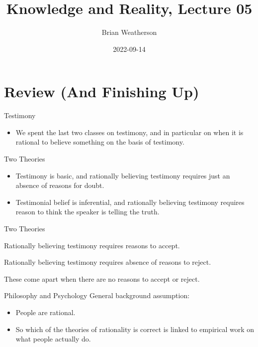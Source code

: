 \documentclass[
  17pt,
  letterpaper,
  ignorenonframetext,
  aspectratio=169,
  handout]{beamer}
\title{Knowledge and Reality, Lecture 05}
\author{Brian Weatherson}
\date{2022-09-14}
\providecommand{\tightlist}{%
  \setlength{\itemsep}{0pt}\setlength{\parskip}{0pt}}\usepackage{longtable,booktabs,array}
\begin{document}
\frame{\titlepage}
\ifdefined\Shaded\renewenvironment{Shaded}{\begin{tcolorbox}[interior hidden, frame hidden, borderline west={3pt}{0pt}{shadecolor}, boxrule=0pt, sharp corners, enhanced, breakable]}{\end{tcolorbox}}\fi

\hypertarget{review-and-finishing-up}{%
\section{Review (And Finishing Up)}\label{review-and-finishing-up}}

\begin{frame}{Testimony}
\protect\hypertarget{testimony}{}
\begin{itemize}[<+->]
\tightlist
\item
  We spent the last two classes on testimony, and in particular on when
  it is rational to believe something on the basis of testimony.
\end{itemize}
\end{frame}

\begin{frame}{Two Theories}
\protect\hypertarget{two-theories}{}
\begin{itemize}[<+->]
\tightlist
\item
  Testimony is basic, and rationally believing testimony requires just
  an absence of reasons for doubt.
\item
  Testimonial belief is inferential, and rationally believing testimony
  requires reason to think the speaker is telling the truth.
\end{itemize}
\end{frame}

\begin{frame}{Two Theories}
\protect\hypertarget{two-theories-1}{}
\begin{description}[<+->]
\tightlist
\item[Reductionism]
Rationally believing testimony requires reasons to accept.
\item[Anti-Reductionism]
Rationally believing testimony requires absence of reasons to reject.
\end{description}

These come apart when there are no reasons to accept or reject.
\end{frame}

\begin{frame}{Philosophy and Psychology}
\protect\hypertarget{philosophy-and-psychology}{}
General background assumption:

\begin{itemize}[<+->]
\tightlist
\item
  People are rational.
\item
  So which of the theories of rationality is correct is linked to
  empirical work on what people actually do.
\end{itemize}
\end{frame}
\end{document}
